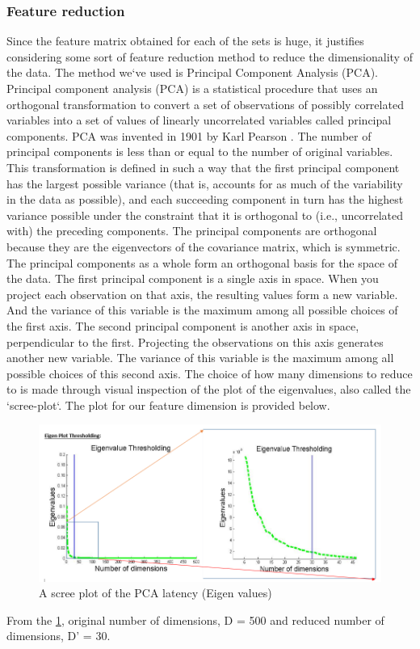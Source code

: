 \documentclass[letterpaper,12pt, onecolumn]{article}%
\begin{document}
\subsubsection*{Feature reduction}
Since the feature matrix obtained for each of the sets is huge, it justifies considering some sort of feature reduction method to reduce the dimensionality of the data. The method we`ve used is Principal Component Analysis (PCA). Principal component analysis (PCA) is a statistical procedure that uses an orthogonal transformation to convert a set of observations of possibly correlated variables into a set of values of linearly uncorrelated variables called principal components. PCA was invented in 1901 by Karl Pearson \citep{jolliffe2005principal}. The number of principal components is less than or equal to the number of original variables. This transformation is defined in such a way that the first principal component has the largest possible variance (that is, accounts for as much of the variability in the data as possible), and each succeeding component in turn has the highest variance possible under the constraint that it is orthogonal to (i.e., uncorrelated with) the preceding components. The principal components are orthogonal because they are the eigenvectors of the covariance matrix, which is symmetric. The principal components as a whole form an orthogonal basis for the space of the data. The first principal component is a single axis in space. When you project each observation on that axis, the resulting values form a new variable. And the variance of this variable is the maximum among all possible choices of the first axis. The second principal component is another axis in space, perpendicular to the first. Projecting the observations on this axis generates another new variable. The variance of this variable is the maximum among all possible choices of this second axis.
The choice of how many dimensions to reduce to is made through visual inspection of the plot of the eigenvalues, also called the `scree-plot`. The plot for our feature dimension is provided below.
\begin{figure}[!hbtp]
 	  \centering
 	   \includegraphics[scale=0.65] {fig_eigValPlot.png} 
 	   \caption{A scree plot of the PCA latency (Eigen values)}
       \label{fig:pcaScreePlot}
\end{figure}
From the \cref{fig:pcaScreePlot}, original number of dimensions, D = 500 and reduced number of dimensions, D' = 30.
\end{document}
